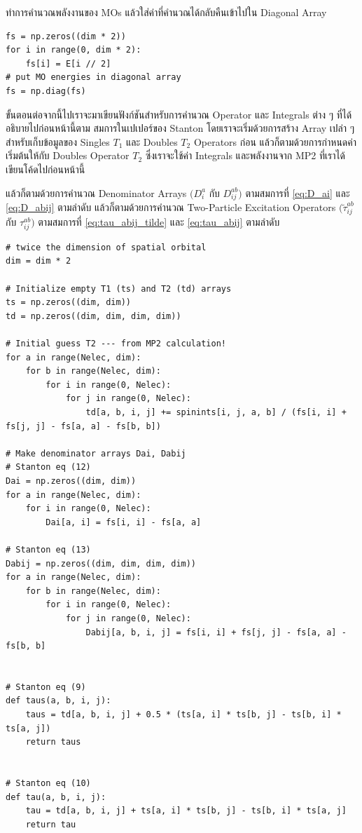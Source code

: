 \vspace{5pt}

\noindent ทำการคำนวณพลังงานของ MOs แล้วใส่ค่าที่คำนวณได้กลับคืนเข้าไปใน Diagonal Array

\vspace{5pt}

\begin{lstlisting}[style=MyPython]
fs = np.zeros((dim * 2))
for i in range(0, dim * 2):
    fs[i] = E[i // 2]
# put MO energies in diagonal array
fs = np.diag(fs)
\end{lstlisting}

\vspace{5pt}

\noindent ขั้นตอนต่อจากนี้ไปเราจะมาเขียนฟังก์ชันสำหรับการคำนวณ Operator และ Integrals ต่าง ๆ ที่ได้อธิบายไปก่อนหน้านี้ตาม%
สมการในเปเปอร์ของ Stanton โดยเราจะเริ่มด้วยการสร้าง Array เปล่า ๆ สำหรับเก็บข้อมูลของ Singles $T_{1}$ และ Doubles $T_{2}$
Operators ก่อน แล้วก็ตามด้วยการกำหนดค่าเริ่มต้นให้กับ Doubles Operator $T_{2}$ ซึ่งเราจะใช้ค่า Integrals และพลังงานจาก MP2
ที่เราได้เขียนโค้ดไปก่อนหน้านี้

\noindent แล้วก็ตามด้วยการคำนวณ Denominator Arrays $(D^{a}_{i}$ กับ $D^{ab}_{ij})$ ตามสมการที่ \eqref{eq:D_ai}
และ \eqref{eq:D_abij} ตามลำดับ แล้วก็ตามด้วยการคำนวณ Two-Particle Excitation Operators $(\tilde{\tau}_{i j}^{a b}$
กับ $\tau_{i j}^{a b})$ ตามสมการที่ \eqref{eq:tau_abij_tilde} และ \eqref{eq:tau_abij} ตามลำดับ

\vspace{5pt}

\begin{lstlisting}[style=MyPython]
# twice the dimension of spatial orbital
dim = dim * 2

# Initialize empty T1 (ts) and T2 (td) arrays
ts = np.zeros((dim, dim))
td = np.zeros((dim, dim, dim, dim))

# Initial guess T2 --- from MP2 calculation!
for a in range(Nelec, dim):
    for b in range(Nelec, dim):
        for i in range(0, Nelec):
            for j in range(0, Nelec):
                td[a, b, i, j] += spinints[i, j, a, b] / (fs[i, i] + fs[j, j] - fs[a, a] - fs[b, b])

# Make denominator arrays Dai, Dabij
# Stanton eq (12)
Dai = np.zeros((dim, dim))
for a in range(Nelec, dim):
    for i in range(0, Nelec):
        Dai[a, i] = fs[i, i] - fs[a, a]

# Stanton eq (13)
Dabij = np.zeros((dim, dim, dim, dim))
for a in range(Nelec, dim):
    for b in range(Nelec, dim):
        for i in range(0, Nelec):
            for j in range(0, Nelec):
                Dabij[a, b, i, j] = fs[i, i] + fs[j, j] - fs[a, a] - fs[b, b]


# Stanton eq (9)
def taus(a, b, i, j):
    taus = td[a, b, i, j] + 0.5 * (ts[a, i] * ts[b, j] - ts[b, i] * ts[a, j])
    return taus


# Stanton eq (10)
def tau(a, b, i, j):
    tau = td[a, b, i, j] + ts[a, i] * ts[b, j] - ts[b, i] * ts[a, j]
    return tau
\end{lstlisting}

